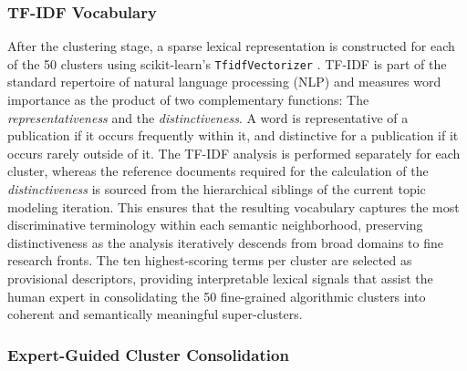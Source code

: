 \documentclass{article}
\begin{document}
	
	\subsubsection{TF-IDF Vocabulary}
	
	After the clustering stage, a sparse lexical representation is constructed for each of the 50 clusters using scikit-learn's \texttt{TfidfVectorizer} \cite{pedregosa2011scikit}. TF-IDF is part of the standard repertoire of natural language processing (NLP) and measures word importance as the product of two complementary functions: The \textit{representativeness} and the \textit{distinctiveness}. A word is representative of a publication if it occurs frequently within it, and distinctive for a publication if it occurs rarely outside of it. The TF-IDF analysis is performed separately for each cluster, whereas the reference documents required for the calculation of the \textit{distinctiveness} is sourced from the hierarchical siblings of the current topic modeling iteration. This ensures that the resulting vocabulary captures the most discriminative terminology within each semantic neighborhood, preserving distinctiveness as the analysis iteratively descends from broad domains to fine research fronts. The ten highest-scoring terms per cluster are selected as provisional descriptors, providing interpretable lexical signals that assist the human expert in consolidating the 50 fine-grained algorithmic clusters into coherent and semantically meaningful super-clusters.
	
	
	\subsubsection{Expert-Guided Cluster Consolidation}
	
\end{document}

